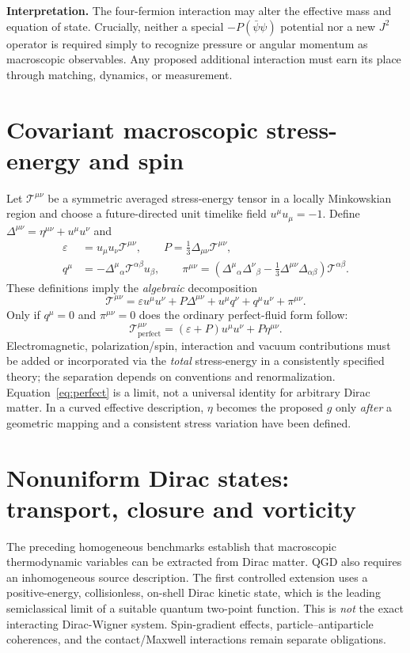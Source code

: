 \documentclass[11pt,a4paper]{article}
\newcommand{\TT}{\mathcal T}
\begin{document}
\noindent\textbf{Interpretation.} The four-fermion interaction may alter the effective mass and equation of state. Crucially, neither a special $-P(\bar\psi\psi)$ potential nor a new $J^2$ operator is required simply to recognize pressure or angular momentum as macroscopic observables. Any proposed additional interaction must earn its place through matching, dynamics, or measurement.

\section{Covariant macroscopic stress-energy and spin}\label{sec:fluid}
Let $\TT^{\mu\nu}$ be a symmetric averaged stress-energy tensor in a locally Minkowskian region and choose a future-directed unit timelike field $u^\mu u_\mu=-1$. Define $\Delta^{\mu\nu}=\eta^{\mu\nu}+u^\mu u^\nu$ and
\begin{align}\label{eq:decomp-def}
\varepsilon&=u_\mu u_\nu\TT^{\mu\nu},\qquad
P=\tfrac13\Delta_{\mu\nu}\TT^{\mu\nu},\\
q^\mu&=-\Delta^\mu{}_{\alpha}\TT^{\alpha\beta}u_\beta,\qquad
\pi^{\mu\nu}=\left(\Delta^\mu{}_{\alpha}\Delta^\nu{}_{\beta}
-\tfrac13\Delta^{\mu\nu}\Delta_{\alpha\beta}\right)\TT^{\alpha\beta}.
\end{align}
These definitions imply the \emph{algebraic} decomposition
\begin{equation}\label{eq:decomp}
\TT^{\mu\nu}=\varepsilon u^\mu u^\nu+P\Delta^{\mu\nu}
+u^\mu q^\nu+q^\mu u^\nu+\pi^{\mu\nu}.
\end{equation}
Only if $q^\mu=0$ and $\pi^{\mu\nu}=0$ does the ordinary perfect-fluid form follow:
\begin{equation}\label{eq:perfect}
\boxed{\TT^{\mu\nu}_{\mathrm{perfect}}=(\varepsilon+P)u^\mu u^\nu+P\eta^{\mu\nu}.}
\end{equation}
Electromagnetic, polarization/spin, interaction and vacuum contributions must be added or incorporated via the \emph{total} stress-energy in a consistently specified theory; the separation depends on conventions and renormalization. Equation~\eqref{eq:perfect} is a limit, not a universal identity for arbitrary Dirac matter. In a curved effective description, $\eta$ becomes the proposed $g$ only \emph{after} a geometric mapping and a consistent stress variation have been defined.


\section{Nonuniform Dirac states: transport, closure and vorticity}\label{sec:nonuniform}
The preceding homogeneous benchmarks establish that macroscopic thermodynamic variables can be extracted from Dirac matter. QGD also requires an inhomogeneous source description. The first controlled extension uses a positive-energy, collisionless, on-shell Dirac kinetic state, which is the leading semiclassical limit of a suitable quantum two-point function. This is \emph{not} the exact interacting Dirac-Wigner system. Spin-gradient effects, particle--antiparticle coherences, and the contact/Maxwell interactions remain separate obligations.
\end{document}
